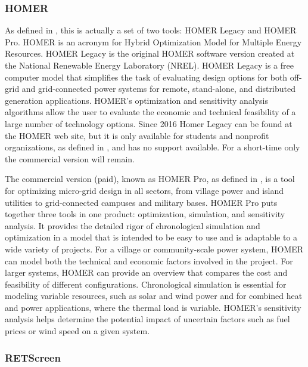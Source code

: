 \subsubsection{HOMER}

As defined in \cite{HOMER}, this is actually a set of two tools: HOMER Legacy and HOMER Pro. HOMER is an acronym for Hybrid Optimization Model for Multiple Energy Resources. HOMER Legacy is the original HOMER software version created at the National Renewable Energy Laboratory (NREL). HOMER Legacy is a free computer model that simplifies the task of evaluating design options for both off-grid and grid-connected power systems for remote, stand-alone, and distributed generation applications. HOMER's optimization and sensitivity analysis algorithms allow the user to evaluate the economic and technical feasibility of a large number of technology options. Since 2016 Homer Legacy can be found at the HOMER web site, but it is only available for students and nonprofit organizations, as defined in \cite{HOMER}, and has no support available. For a short-time only the commercial version will remain.
 
The commercial version (paid), known as HOMER Pro, as defined in \cite{Swarnkar}, is a tool for optimizing micro-grid design in all sectors, from village power and island utilities to grid-connected campuses and military bases. HOMER Pro puts together three tools in one product: optimization, simulation, and sensitivity analysis. It provides the detailed rigor of chronological simulation and optimization in a model that is intended to be easy to use and is adaptable to a wide variety of projects. For a village or community-scale power system, HOMER can model both the technical and economic factors involved in the project. For larger systems, HOMER can provide an overview that compares the cost and feasibility of different configurations. Chronological simulation is essential for modeling variable resources, such as solar and wind power and for combined heat and power applications, where the thermal load is variable. HOMER's sensitivity analysis helps determine the potential impact of uncertain factors such as fuel prices or wind speed on a given system. 

\subsubsection{RETScreen}

